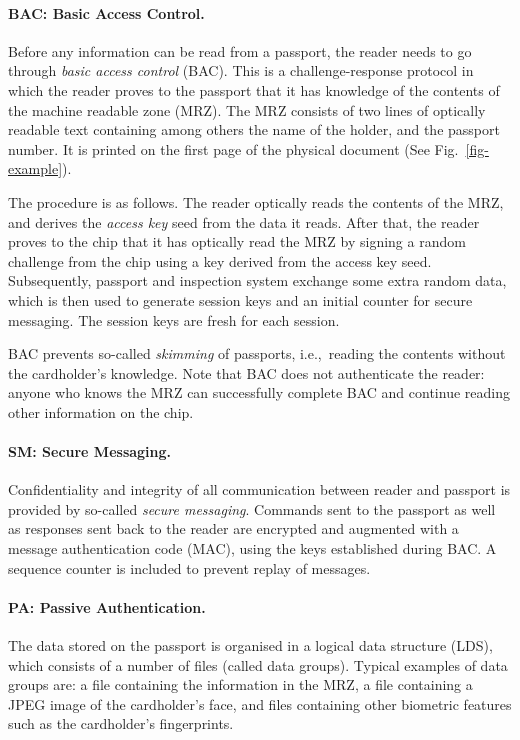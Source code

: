 \documentclass[runningheads,envcountsame,envcountsect,oribibl]{llncs}
\newcommand{\ie}{{i.e.},\ }		\newcommand{\eg}{{e.g.},\ }		\newcommand{\etal}{\textit{et al.}~}
\begin{document}
\paragraph{BAC: Basic Access Control.}
Before any information can be read from a passport, the reader needs to
go through \emph{basic access control\/} (BAC). This is a challenge-response
protocol in which the reader proves to the passport that it has knowledge of
the contents of the machine readable zone (MRZ). The MRZ consists of two lines
of optically readable text containing among others the name of the holder,
and the passport number. It is printed on the first page of
the physical document (See Fig.~\ref{fig-example}).

The procedure is as follows. The reader optically reads the contents of the
MRZ, and derives the \emph{access key} seed
 from the data it reads.
After that, the reader proves to the chip that it has optically read the MRZ by
signing a random challenge from the chip using a key derived from the access
key seed.
Subsequently, 
passport and inspection system exchange some extra random data, which is then
used to generate session keys and an initial counter for secure messaging.
The session keys are fresh for each session.

BAC prevents so-called \emph{skimming\/} of passports, \ie reading the
contents without the cardholder's knowledge. Note that BAC does not
authenticate the reader: anyone who knows the MRZ can successfully
complete BAC and continue reading other information on the chip.

\paragraph{SM: Secure Messaging.}

Confidentiality and integrity of all communication between reader and passport
is provided by so-called \emph{secure messaging}.
Commands sent to the passport as well as responses
sent back to the reader are encrypted and augmented with a message
authentication code (MAC), using the keys established during BAC. 
A sequence counter is included to prevent replay of messages.

\paragraph{PA: Passive Authentication.}

The data stored on the passport is organised in a logical data structure (LDS),
which consists of a number of files (called data groups). Typical examples of data
groups are: a file containing the information in the MRZ, a file containing a
JPEG image of the cardholder's face, and files containing other biometric
features such as the cardholder's fingerprints.
\end{document}
